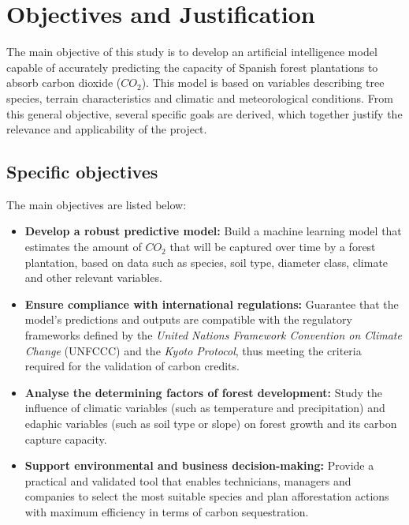 \section{Objectives and Justification}

The main objective of this study is to develop an artificial intelligence model capable of accurately predicting the capacity of Spanish forest plantations to absorb carbon dioxide (\(CO_2\)). This model is based on variables describing tree species, terrain characteristics and climatic and meteorological conditions. From this general objective, several specific goals are derived, which together justify the relevance and applicability of the project.

\subsection{Specific objectives}

The main objectives are listed below:

\begin{itemize}
    \item \textbf{Develop a robust predictive model:} Build a machine learning model that estimates the amount of \(CO_2\) that will be captured over time by a forest plantation, based on data such as species, soil type, diameter class, climate and other relevant variables.


    \item \textbf{Ensure compliance with international regulations:} Guarantee that the model's predictions and outputs are compatible with the regulatory frameworks defined by the \textit{United Nations Framework Convention on Climate Change} (UNFCCC) and the \textit{Kyoto Protocol}, thus meeting the criteria required for the validation of carbon credits.

    \item \textbf{Analyse the determining factors of forest development:} Study the influence of climatic variables (such as temperature and precipitation) and edaphic variables (such as soil type or slope) on forest growth and its carbon capture capacity.

    \item \textbf{Support environmental and business decision-making:} Provide a practical and validated tool that enables technicians, managers and companies to select the most suitable species and plan afforestation actions with maximum efficiency in terms of carbon sequestration.
\end{itemize}

